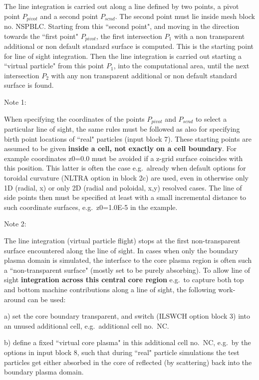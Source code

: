 The line integration is carried out along a line defined by two points, a pivot
point $P_{pivot}$ and a second point $P_{scnd}$.
The second point must lie inside mesh block no.
NSPBLC.
Starting from this ``second point", and moving in the direction towards the
``first point"	    $P_{pivot}$, the first intersection $P_1$ with a non
transparent additional or non default standard surface is computed.
This is the starting point for line of sight integration.
Then the line integration is carried out starting a ``virtual particle" from
this point $P_1$, into the computational area, until the next intersection
$P_2$ with any non transparent additional or non default standard surface is
found.

\medskip

Note 1:

When specifying the coordinates of the points $P_{pivot}$ and $P_{scnd}$ to
select a particular line of sight, the same rules must be followed as also for
specifying birth point locations of ``real" particles (input block 7).
These starting points are assumed to be given \textbf{inside a cell, not 
exactly on a cell boundary}.
For example coordinates z0=0.0 must be avoided if a z-grid surface coincides
with this position.
This latter is often the case e.g.\ already when default options for toroidal
curvature (NLTRA option in block 2c) are used, even in otherwise only 1D
(radial, x) or only 2D (radial and poloidal, x,y) resolved cases.
The line of side points then must be specified at least with a small
incremental distance to such coordinate surfaces, e.g.\ z0=1.0E-5 in the
example.

Note 2:

The line integration (virtual particle flight) stops at the first
non-transparent surface encountered along the line of sight.
In cases when only the boundary plasma domain is simulated, the interface to
the core plasma region is often such a ``non-transparent surface" (mostly set
to be purely absorbing).
To allow line of sight \textbf{integration across this central core region}
e.g.\ to capture both  top and bottom machine contributions along a line of
sight, the following work-around can be used:

a) set the core boundary transparent, and switch (ILSWCH option block 3) into
an unused additional cell,
e.g.\ additional cell no.\ NC.

b) define a fixed ``virtual core plasma" in this additional cell no.\ NC, e.g.\
by the options in input block 8,
such that during ``real" particle simulations the test particles get either
absorbed in the core of reflected (by scattering)
back into the boundary plasma domain.

